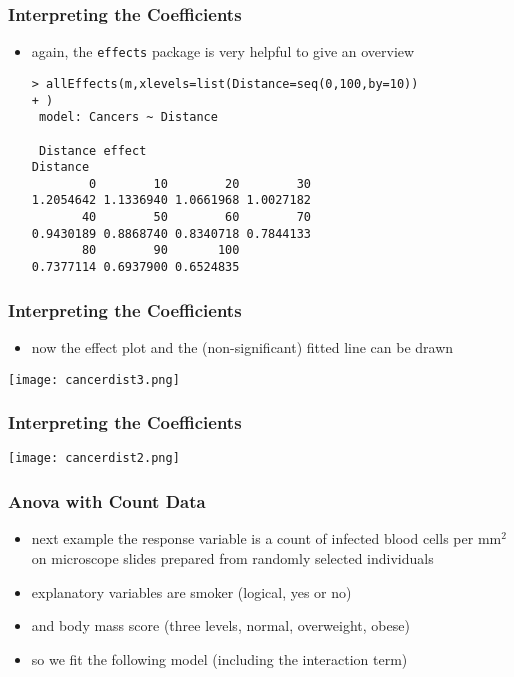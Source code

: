 \begin{frame}[fragile]\frametitle{Interpreting the Coefficients}
  \begin{itemize}
\item again, the \texttt{effects} package is very helpful to give an overview \small
\begin{verbatim}
> allEffects(m,xlevels=list(Distance=seq(0,100,by=10))
+ )
 model: Cancers ~ Distance

 Distance effect
Distance
        0        10        20        30 
1.2054642 1.1336940 1.0661968 1.0027182 
       40        50        60        70
0.9430189 0.8868740 0.8340718 0.7844133
       80        90       100 
0.7377114 0.6937900 0.6524835 
\end{verbatim}
  \end{itemize}
\end{frame}

\begin{frame}[fragile]\frametitle{Interpreting the Coefficients}
  \begin{itemize}
  \item now the effect plot and the (non-significant) fitted line can be drawn
  \end{itemize}
\begin{center}
\texttt{[image: cancerdist3.png]}
\end{center}
\end{frame}

\begin{frame}[fragile]\frametitle{Interpreting the Coefficients}
\begin{center}
\texttt{[image: cancerdist2.png]}
\end{center}
\end{frame}

\begin{frame}[fragile]\frametitle{Anova with Count Data}
\begin{itemize}
\item next example the response variable is a count of infected blood cells per $\mbox{mm}^2$ on microscope slides prepared from randomly selected individuals
\item explanatory variables are smoker (logical, yes or no)
\item and body mass score (three levels, normal, overweight, obese)
\item so we fit the following model (including the interaction term)\tiny
\end{itemize}
\end{frame}


